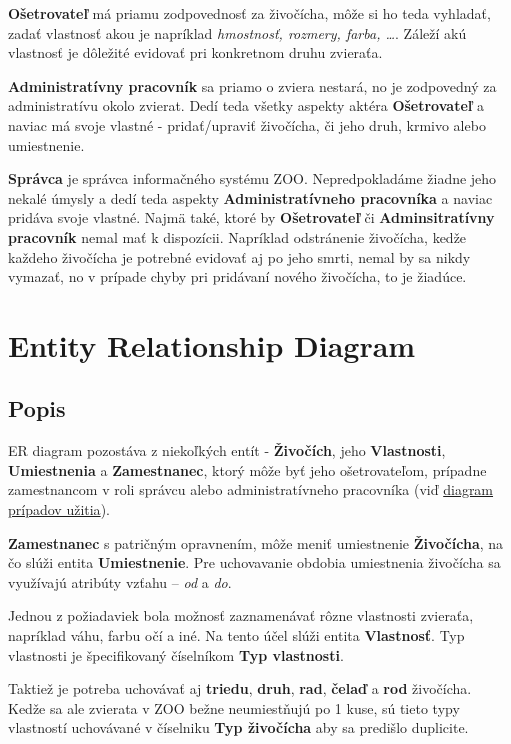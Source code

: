\documentclass[11pt, a4paper]{article}
\begin{document}
			\textbf{Ošetrovateľ} má priamu zodpovednosť za živočícha, môže si ho teda vyhladať, zadať vlastnosť akou je napríklad \textit{hmostnosť, rozmery, farba, \dots}. Záleží akú vlastnosť je dôležité evidovať pri konkretnom druhu zvieraťa.

			\textbf{Administratívny pracovník} sa priamo o zviera nestará, no je zodpovedný za administratívu okolo zvierat. Dedí teda všetky aspekty aktéra \textbf{Ošetrovateľ} a naviac má svoje vlastné - pridať/upraviť živočícha, či jeho druh, krmivo alebo umiestnenie.

			\textbf{Správca} je správca informačného systému ZOO. Nepredpokladáme žiadne jeho nekalé úmysly a dedí teda aspekty \textbf{Administratívneho pracovníka} a naviac pridáva svoje vlastné. Najmä také, ktoré by \textbf{Ošetrovateľ} či \textbf{Adminsitratívny pracovník} nemal mať k dispozícii. Napríklad odstránenie živočícha, kedže každeho živočícha je potrebné evidovať aj po jeho smrti, nemal by sa nikdy vymazať, no v prípade chyby pri pridávaní nového živočícha, to je žiadúce.

	    \section{Entity Relationship Diagram}
		\newpage
		\subsection{Popis}
			ER diagram pozostáva z niekoľkých entít - \textbf{Živočích}, jeho \textbf{Vlastnosti}, \textbf{Umiestnenia} a \textbf{Zamestnanec}, ktorý môže byť jeho ošetrovateľom, prípadne zamestnancom v roli správcu alebo administratívneho pracovníka (viď \hyperref[usecase]{diagram prípadov užitia}).

			\textbf{Zamestnanec} s patričným opravnením, môže meniť umiestnenie \textbf{Živočícha}, na čo slúži entita \textbf{Umiestnenie}. Pre uchovavanie obdobia umiestnenia živočícha sa využívajú atribúty vzťahu -- \textit{od} a \textit{do}.

			Jednou z požiadaviek bola možnosť zaznamenávať rôzne vlastnosti zvieraťa, napríklad váhu, farbu očí a iné. Na tento účel slúži entita \textbf{Vlastnosť}. Typ vlastnosti je špecifikovaný číselníkom \textbf{Typ vlastnosti}.

			Taktiež je potreba uchovávať aj \textbf{triedu}, \textbf{druh}, \textbf{rad}, \textbf{čelaď} a \textbf{rod} živočícha. Kedže sa ale zvierata v ZOO bežne neumiestňujú po 1 kuse, sú tieto typy vlastností uchovávané v číselniku \textbf{Typ živočícha} aby sa predišlo duplicite.
\end{document}
